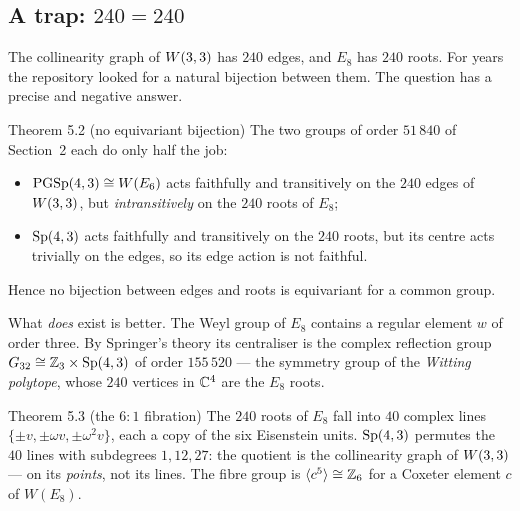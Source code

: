 \subsection{A trap: \texorpdfstring{$240=240$}{240 = 240}}
\label{sec:e8-trap}

The collinearity graph of $W(3,3)$ has $240$ edges, and $E_8$ has $240$ roots. For years the
repository looked for a natural bijection between them. The question has a precise and
negative answer.

\begin{result}{Theorem 5.2 (no equivariant bijection) \hfill \tierC}
The two groups of order $51\,840$ of Section~2 each do only half the job:
\begin{itemize}
\item $\mathrm{PGSp}(4,3)\cong W(E_6)$ acts faithfully and transitively on the $240$ edges of $W(3,3)$,
      but \emph{intransitively} on the $240$ roots of $E_8$;
\item $\mathrm{Sp}(4,3)$ acts faithfully and transitively on the $240$ roots, but its centre acts
      trivially on the edges, so its edge action is not faithful.
\end{itemize}
Hence no bijection between edges and roots is equivariant for a common group.
\end{result}

What \emph{does} exist is better. The Weyl group of $E_8$ contains a regular element $w$
of order three. By Springer's theory \cite{Springer} its centraliser is the complex reflection group
$G_{32}\cong\mathbb{Z}_3\times\mathrm{Sp}(4,3)$ of order $155\,520$ --- the symmetry group of the
\emph{Witting polytope}, whose $240$ vertices in $\mathbb{C}^4$ are the $E_8$ roots.

\begin{result}{Theorem 5.3 (the $6:1$ fibration) \hfill \tierC}
The $240$ roots of $E_8$ fall into $40$ complex lines $\{\pm v,\pm\omega v,\pm\omega^2 v\}$,
each a copy of the six Eisenstein units. $\mathrm{Sp}(4,3)$ permutes the $40$ lines with
subdegrees $1,12,27$: the quotient is the collinearity graph of $W(3,3)$ --- on its
\emph{points}, not its lines. The fibre group is $\langle c^5\rangle\cong\mathbb{Z}_6$ for a
Coxeter element $c$ of $W(E_8)$.
\end{result}

